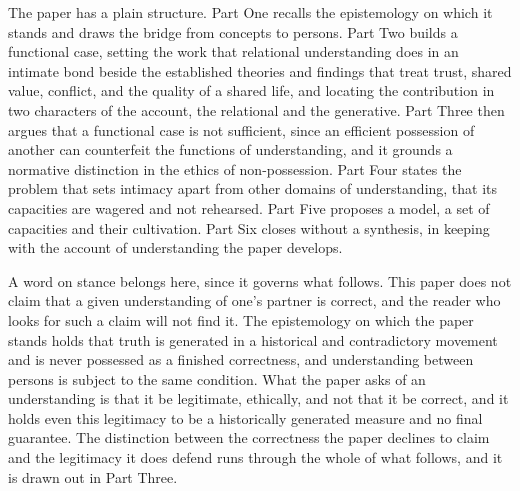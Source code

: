The paper has a plain structure. Part One recalls the epistemology on which it stands and draws the bridge from concepts to persons. Part Two builds a functional case, setting the work that relational understanding does in an intimate bond beside the established theories and findings that treat trust, shared value, conflict, and the quality of a shared life, and locating the contribution in two characters of the account, the relational and the generative. Part Three then argues that a functional case is not sufficient, since an efficient possession of another can counterfeit the functions of understanding, and it grounds a normative distinction in the ethics of non-possession. Part Four states the problem that sets intimacy apart from other domains of understanding, that its capacities are wagered and not rehearsed. Part Five proposes a model, a set of capacities and their cultivation. Part Six closes without a synthesis, in keeping with the account of understanding the paper develops.

A word on stance belongs here, since it governs what follows. This paper does not claim that a given understanding of one's partner is correct, and the reader who looks for such a claim will not find it. The epistemology on which the paper stands holds that truth is generated in a historical and contradictory movement and is never possessed as a finished correctness, and understanding between persons is subject to the same condition. What the paper asks of an understanding is that it be legitimate, ethically, and not that it be correct, and it holds even this legitimacy to be a historically generated measure and no final guarantee. The distinction between the correctness the paper declines to claim and the legitimacy it does defend runs through the whole of what follows, and it is drawn out in Part Three.
